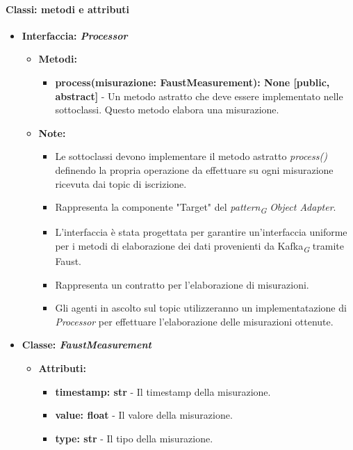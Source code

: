 \paragraph*{Classi: metodi e attributi}
\begin{itemize}
    \item{\textbf{Interfaccia: \textit{Processor}}}
    \begin{itemize}
    \item\textbf{Metodi: }
    \begin{itemize}
        \item \textbf{process(misurazione: FaustMeasurement): None [public, abstract]} - Un metodo astratto che deve essere implementato nelle sottoclassi. Questo metodo elabora una misurazione.
    \end{itemize}
    \item\textbf{Note:}
        \begin{itemize}
            \item  Le sottoclassi devono implementare il metodo astratto \textit{process()} definendo la propria operazione da effettuare su ogni misurazione ricevuta dai topic di iscrizione.
            \item Rappresenta la componente "Target" del \textit{pattern}\textsubscript{\textit{G}} \textit{Object Adapter}.
            \item L'interfaccia è stata progettata per garantire un'interfaccia uniforme per i metodi di elaborazione dei dati provenienti da Kafka\textsubscript{\textit{G}} tramite Faust.
            \item Rappresenta un contratto per l'elaborazione di misurazioni.
            \item Gli agenti in ascolto sul topic utilizzeranno un implementatazione di \textit{Processor} per effettuare l'elaborazione delle misurazioni ottenute.
        \end{itemize}
    \end{itemize}
    \item{\textbf{Classe: \textit{FaustMeasurement}}}
    \begin{itemize}
    \item\textbf{Attributi:}
        \begin{itemize}
        \item \textbf{timestamp: str} - Il timestamp della misurazione.
        \item \textbf{value: float} - Il valore della misurazione.
        \item \textbf{type: str} - Il tipo della misurazione.

\end{itemize}
\end{itemize}
\end{itemize}

